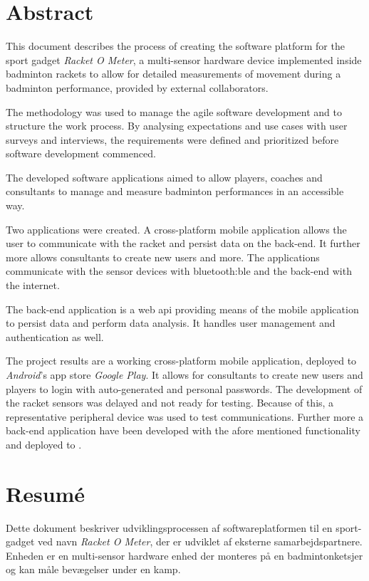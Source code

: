 \chapter*{Abstract}
This document describes the process of creating the software platform for the sport gadget \textit{Racket O Meter}, a multi-sensor hardware device implemented inside badminton rackets to allow for detailed measurements of movement during a badminton performance, provided by external collaborators.

The  methodology was used to manage the agile software development and to structure the work process.
By analysing expectations and use cases with user surveys and interviews, the requirements were defined and prioritized before software development commenced.

The developed software applications aimed to allow players, coaches and consultants to manage and measure badminton performances in an accessible way.

Two applications were created.
A cross-platform mobile application allows the user to communicate with the racket and persist data on the back-end.
It further more allows consultants to create new users and more.
The applications communicate with the sensor devices with \gls{bluetooth:ble} and the back-end with the internet.

The back-end application is a web \gls{api} providing means of the mobile application to persist data and perform data analysis.
It handles user management and authentication as well.

The project results are a working cross-platform mobile application, deployed to \textit{Android}'s app store \textit{Google Play}.
It allows for consultants to create new users and players to login with auto-generated and personal passwords.
The development of the racket sensors was delayed and not ready for testing.
Because of this, a representative peripheral device was used to test  communications.
Further more a back-end application have been developed with the afore mentioned functionality and deployed to .

\chapter*{Resumé}
Dette dokument beskriver udviklingsprocessen af softwareplatformen til en sport-gadget ved navn \textit{Racket O Meter}, der er udviklet af eksterne samarbejdspartnere.
Enheden er en multi-sensor hardware enhed der monteres på en badmintonketsjer og kan måle bevægelser under en kamp.

